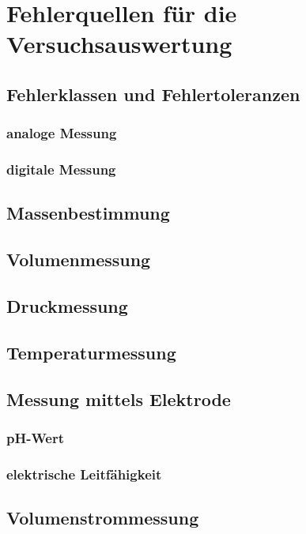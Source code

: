 \section{Fehlerquellen für die Versuchsauswertung}

\subsection{Fehlerklassen und Fehlertoleranzen}
\subsubsection{analoge Messung}
\subsubsection{digitale Messung}

\subsection{Massenbestimmung}

\subsection{Volumenmessung}

\subsection{Druckmessung}

\subsection{Temperaturmessung}

\subsection{Messung mittels Elektrode}
\subsubsection{pH-Wert}
\subsubsection{elektrische Leitfähigkeit}

\subsection{Volumenstrommessung}

